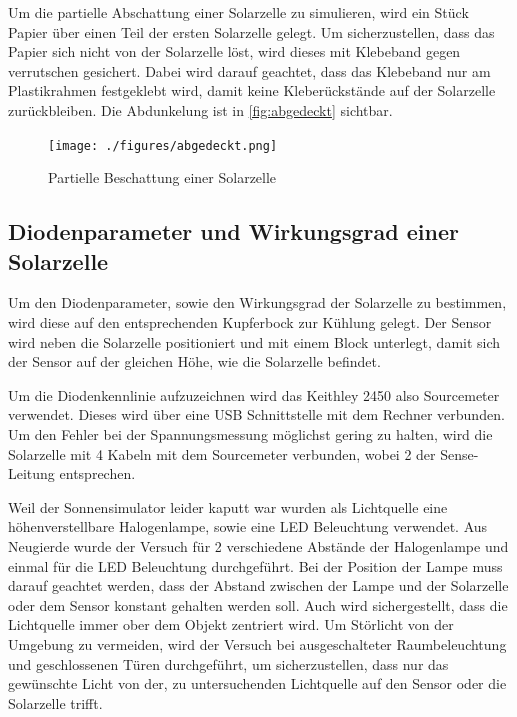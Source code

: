 \documentclass[12pt,english,ngerman]{scrartcl}
\begin{document}
Um die partielle Abschattung einer Solarzelle zu simulieren, wird ein Stück
Papier über einen Teil der ersten Solarzelle gelegt. Um sicherzustellen, dass
das Papier sich nicht von der Solarzelle löst, wird dieses mit Klebeband gegen
verrutschen gesichert. Dabei wird darauf geachtet, dass das Klebeband nur am
Plastikrahmen festgeklebt wird, damit keine Kleberückstände auf der Solarzelle
zurückbleiben. Die Abdunkelung ist in \autoref{fig:abgedeckt} sichtbar.

\begin{figure}[H]
	\begin{center}
		\texttt{[image: ./figures/abgedeckt.png]}
	\end{center}
	\caption{Partielle Beschattung einer Solarzelle
	}\label{fig:abgedeckt}
\end{figure}

\subsection{Diodenparameter und Wirkungsgrad einer Solarzelle}

Um den Diodenparameter, sowie den Wirkungsgrad der Solarzelle zu bestimmen,
wird diese auf den entsprechenden Kupferbock zur Kühlung gelegt. Der Sensor
wird neben die Solarzelle positioniert und mit einem Block unterlegt, damit
sich der Sensor auf der gleichen Höhe, wie die Solarzelle befindet.

Um die Diodenkennlinie aufzuzeichnen wird das Keithley 2450 also Sourcemeter
verwendet. Dieses wird über eine USB Schnittstelle mit dem Rechner verbunden.
Um den Fehler bei der Spannungsmessung möglichst gering zu halten, wird die
Solarzelle mit 4 Kabeln mit dem Sourcemeter verbunden, wobei 2 der
Sense-Leitung entsprechen.

Weil der Sonnensimulator leider kaputt war wurden als Lichtquelle eine
höhenverstellbare Halogenlampe, sowie eine LED Beleuchtung verwendet. Aus
Neugierde wurde der Versuch für 2 verschiedene Abstände der Halogenlampe und
einmal für die LED Beleuchtung durchgeführt. Bei der Position der Lampe muss
darauf geachtet werden, dass der Abstand zwischen der Lampe und der Solarzelle
oder dem Sensor konstant gehalten werden soll. Auch wird sichergestellt, dass
die Lichtquelle immer ober dem Objekt zentriert wird. Um Störlicht von der
Umgebung zu vermeiden, wird der Versuch bei ausgeschalteter Raumbeleuchtung und
geschlossenen Türen durchgeführt, um sicherzustellen, dass nur das gewünschte
Licht von der, zu untersuchenden Lichtquelle auf den Sensor oder die Solarzelle
trifft.
\end{document}
